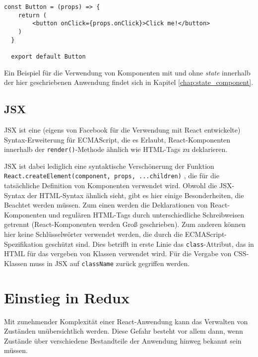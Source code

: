 
\begin{lstlisting}[caption={Simplifizierte Schreibweise für Komponenten ohne \textit{state}}, label=lst:stateless]
  const Button = (props) => {
  	return (
  		<button onClick={props.onClick}>Click me!</button>
  	)
  }

  export default Button
\end{lstlisting}

Ein Beispiel für die Verwendung von Komponenten mit und ohne \textit{state} innerhalb der hier geschriebenen Anwendung findet sich in Kapitel \ref{chap:state_component}.

\subsection{JSX}
JSX ist eine (eigens von Facebook für die Verwendung mit React entwickelte) Syntax-Erweiterung für ECMAScript, die es Erlaubt, React-Komponenten innerhalb der \verb|render()|-Methode ähnlich wie HTML-Tags zu deklarieren.

JSX ist dabei lediglich eine syntaktische Verschönerung der Funktion \verb|React.createElement(component, props, ...children)| \cite{ReactJSX}, die für die tatsächliche Definition von Komponenten verwendet wird.
Obwohl die JSX-Syntax der HTML-Syntax ähnlich sieht, gibt es hier einige Besonderheiten, die Beachtet werden müssen.
Zum einen werden die Deklarationen von React-Komponenten und regulären HTML-Tags durch unterschiedliche Schreibweisen getrennt (React-Komponenten werden Groß geschrieben).
Zum anderen können hier keine Schlüsselwörter verwendet werden, die durch die ECMAScript-Spezifikation geschützt sind\footnotemark{}. Dies betrifft in erste Linie das \verb|class|-Attribut, das in HTML für das vergeben von Klassen verwendet wird. Für die Vergabe von CSS-Klassen muss in JSX auf \verb|className| zurück gegriffen werden.


\section{Einstieg in Redux}
Mit zunehmender Komplexität einer React-Anwendung kann das Verwalten von Zuständen unübersichtlich werden. Diese Gefahr besteht vor allem dann, wenn Zustände über verschiedene Bestandteile der Anwendung hinweg bekannt sein müssen.

